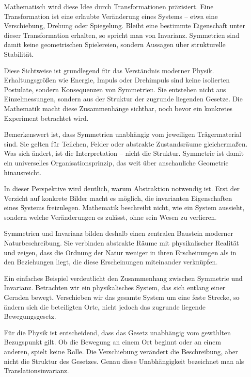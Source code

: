Mathematisch wird diese Idee
durch Transformationen präzisiert.
Eine Transformation ist eine erlaubte Veränderung eines Systems --
etwa eine Verschiebung,
Drehung
oder Spiegelung.
Bleibt eine bestimmte Eigenschaft unter dieser Transformation erhalten,
so spricht man von Invarianz.
Symmetrien sind damit keine geometrischen Spielereien,
sondern Aussagen über strukturelle Stabilität.

Diese Sichtweise ist grundlegend
für das Verständnis moderner Physik.
Erhaltungsgrößen
wie Energie,
Impuls
oder Drehimpuls
sind keine isolierten Postulate,
sondern Konsequenzen von Symmetrien.
Sie entstehen nicht aus Einzelmessungen,
sondern aus der Struktur der zugrunde liegenden Gesetze.
Die Mathematik macht diese Zusammenhänge sichtbar,
noch bevor ein konkretes Experiment betrachtet wird.

Bemerkenswert ist,
dass Symmetrien unabhängig
vom jeweiligen Trägermaterial sind.
Sie gelten für Teilchen,
Felder
oder abstrakte Zustandsräume gleichermaßen.
Was sich ändert,
ist die Interpretation --
nicht die Struktur.
Symmetrie ist damit
ein universelles Organisationsprinzip,
das weit über anschauliche Geometrie hinausreicht.

In dieser Perspektive wird deutlich,
warum Abstraktion notwendig ist.
Erst der Verzicht auf konkrete Bilder
macht es möglich,
die invarianten Eigenschaften eines Systems freizulegen.
Mathematik beschreibt nicht,
wie ein System aussieht,
sondern welche Veränderungen es zulässt,
ohne sein Wesen zu verlieren.

Symmetrien und Invarianz
bilden deshalb einen zentralen Baustein moderner Naturbeschreibung.
Sie verbinden abstrakte Räume
mit physikalischer Realität
und zeigen,
dass die Ordnung der Natur
weniger in ihren Erscheinungen
als in den Beziehungen liegt,
die diese Erscheinungen miteinander verknüpfen.

Ein einfaches Beispiel verdeutlicht
den Zusammenhang zwischen Symmetrie und Invarianz.
Betrachten wir ein physikalisches System,
das sich entlang einer Geraden bewegt.
Verschieben wir das gesamte System
um eine feste Strecke,
so ändern sich die beteiligten Orte,
nicht jedoch das zugrunde liegende Bewegungsgesetz.

Für die Physik ist entscheidend,
dass das Gesetz unabhängig vom gewählten Bezugspunkt gilt.
Ob die Bewegung an einem Ort beginnt
oder an einem anderen,
spielt keine Rolle.
Die Verschiebung verändert die Beschreibung,
aber nicht die Struktur des Gesetzes.
Genau diese Unabhängigkeit
bezeichnet man als Translationsinvarianz.

